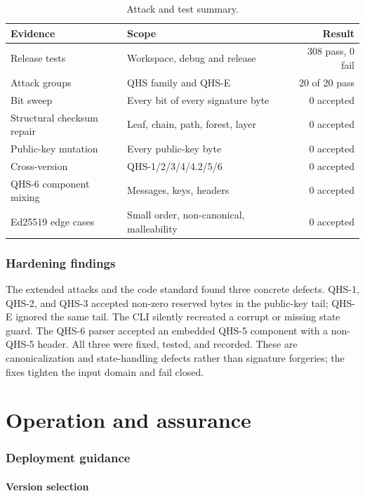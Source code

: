 \documentclass[11pt,a4paper]{article}
\theoremstyle{remark}
\begin{document}
\begin{table}[ht]
\centering
\caption{Attack and test summary.}
\label{tab:attacks}
\small
\begin{tabularx}{\textwidth}{@{}l X r@{}}
\toprule
Evidence & Scope & Result\\
\midrule
Release tests & Workspace, debug and release & 308 pass, 0 fail\\
Attack groups & QHS family and QHS-E & 20 of 20 pass\\
Bit sweep & Every bit of every signature byte & 0 accepted\\
Structural checksum repair & Leaf, chain, path, forest, layer & 0 accepted\\
Public-key mutation & Every public-key byte & 0 accepted\\
Cross-version & QHS-1/2/3/4/4.2/5/6 & 0 accepted\\
QHS-6 component mixing & Messages, keys, headers & 0 accepted\\
Ed25519 edge cases & Small order, non-canonical, malleability & 0 accepted\\
\bottomrule
\end{tabularx}
\end{table}

\section{Hardening findings}

The extended attacks and the code standard found three concrete defects.
QHS-1, QHS-2, and QHS-3 accepted non-zero reserved bytes in the public-key tail;
QHS-E ignored the same tail. The CLI silently recreated a corrupt or missing
state guard. The QHS-6 parser accepted an embedded QHS-5 component with a
non-QHS-5 header. All three were fixed, tested, and recorded. These are
canonicalization and state-handling defects rather than signature forgeries; the
fixes tighten the input domain and fail closed.

\part{Operation and assurance}

\section{Deployment guidance}

\subsection{Version selection}
\end{document}

